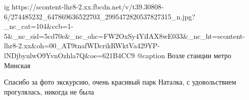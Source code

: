 
 
 
 
 

\ifcmt
  ig https://scontent-lhr8-2.xx.fbcdn.net/v/t39.30808-6/274485232_647869636522703_2995472820537827315_n.jpg?_nc_cat=104&ccb=1-5&_nc_sid=5cd70e&_nc_ohc=FW2OxSy4YiIAX8wE033&_nc_ht=scontent-lhr8-2.xx&oh=00_AT9tnafWDcrikRWktVa429YP-lNDjbyulwO9YvnOzhla7Q&oe=621B4CC9
	@caption Возле станции метро Минская
\fi


Спасибо за фото экскурсию, очень красивый парк Наталка, с удовольствием
прогулялась, никогда не была

